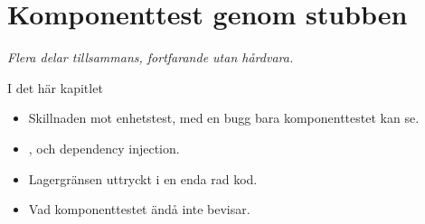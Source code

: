 \chapter{Komponenttest genom stubben}
\label{ch:komponent}


{\large\itshape Flera delar tillsammans, fortfarande utan hårdvara.\par}

\begin{chapterbox}{I det här kapitlet}
\begin{itemize}
  \item Skillnaden mot enhetstest, med en bugg bara komponenttestet kan se.
  \item {}, och dependency injection.
  \item Lagergränsen uttryckt i en enda rad kod.
  \item Vad komponenttestet ändå inte bevisar.
\end{itemize}
\end{chapterbox}




